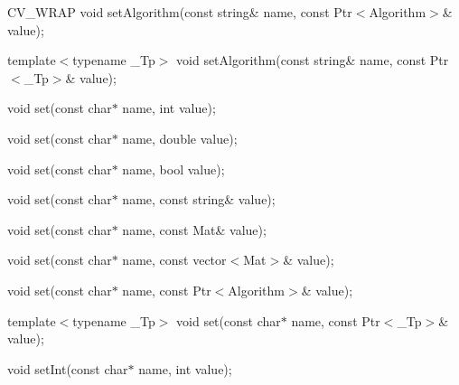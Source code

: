 {\ttfamily }

{\ttfamily }

{\ttfamily C\+V\+\_\+\+W\+R\+AP void set\+Algorithm(const string\& name, const Ptr$<$\+Algorithm$>$\& value);}

{\ttfamily }

{\ttfamily }

{\ttfamily template$<$typename \+\_\+\+Tp$>$ void set\+Algorithm(const string\& name, const Ptr$<$\+\_\+\+Tp$>$\& value);}

{\ttfamily }

{\ttfamily }

{\ttfamily void set(const char$\ast$ name, int value);}

{\ttfamily }

{\ttfamily }

{\ttfamily void set(const char$\ast$ name, double value);}

{\ttfamily }

{\ttfamily }

{\ttfamily void set(const char$\ast$ name, bool value);}

{\ttfamily }

{\ttfamily }

{\ttfamily void set(const char$\ast$ name, const string\& value);}

{\ttfamily }

{\ttfamily }

{\ttfamily void set(const char$\ast$ name, const Mat\& value);}

{\ttfamily }

{\ttfamily }

{\ttfamily void set(const char$\ast$ name, const vector$<$\+Mat$>$\& value);}

{\ttfamily }

{\ttfamily }

{\ttfamily void set(const char$\ast$ name, const Ptr$<$\+Algorithm$>$\& value);}

{\ttfamily }

{\ttfamily }

{\ttfamily template$<$typename \+\_\+\+Tp$>$ void set(const char$\ast$ name, const Ptr$<$\+\_\+\+Tp$>$\& value);}

{\ttfamily }

{\ttfamily }

{\ttfamily void set\+Int(const char$\ast$ name, int value);}

{\ttfamily }

{\ttfamily }

